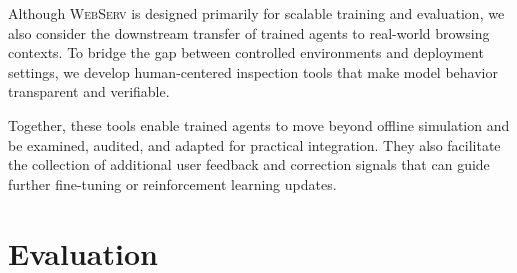 \documentclass{article}
\DeclareRobustCommand{\projectname}{\textsc{WebServ}\xspace}
\begin{document}
Although \projectname is designed primarily for scalable training and evaluation, we also consider the downstream transfer of trained agents to real-world browsing contexts. To bridge the gap between controlled environments and deployment settings, we develop human-centered inspection tools that make model behavior transparent and verifiable.

Together, these tools enable trained agents to move beyond offline simulation and be examined, audited, and adapted for practical integration. They also facilitate the collection of additional user feedback and correction signals that can guide further fine-tuning or reinforcement learning updates.





\section{Evaluation}
\end{document}

